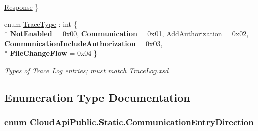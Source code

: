 \begin{DoxyCompactItemize}
\hyperlink{namespace_cloud_api_public_1_1_static_a5c3e1c9c171c6fc2d14d98e753f33c72}{Response}
 \}
\begin{DoxyCompactList}\small\item\em \end{DoxyCompactList}\item 
enum \hyperlink{namespace_cloud_api_public_1_1_static_a7e5ae8f2a85f427de3d6c8a5afcbb029}{Trace\-Type} \-: int \{ \\*
{\bfseries Not\-Enabled} = 0x00, 
{\bfseries Communication} = 0x01, 
\hyperlink{namespace_cloud_api_public_1_1_static_a7e5ae8f2a85f427de3d6c8a5afcbb029}{Add\-Authorization} = 0x02, 
{\bfseries Communication\-Include\-Authorization} = 0x03, 
\\*
{\bfseries File\-Change\-Flow} = 0x04
 \}
\begin{DoxyCompactList}\small\item\em Types of Trace Log entries; must match Trace\-Log.\-xsd \end{DoxyCompactList}\end{DoxyCompactItemize}


\subsection{Enumeration Type Documentation}
\hypertarget{namespace_cloud_api_public_1_1_static_a5c3e1c9c171c6fc2d14d98e753f33c72}{
\subsubsection[{Communication\-Entry\-Direction}]{\setlength{\rightskip}{0pt plus 5cm}enum {\bf Cloud\-Api\-Public.\-Static.\-Communication\-Entry\-Direction}}}\label{namespace_cloud_api_public_1_1_static_a5c3e1c9c171c6fc2d14d98e753f33c72}




